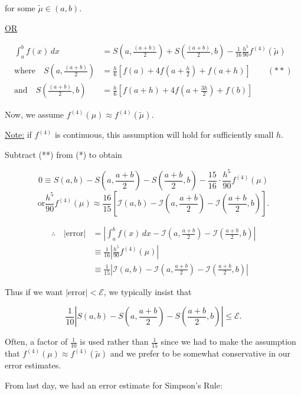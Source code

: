\documentclass[12pt]{article}
\newcommand{\bigEps}{\mathcal{E}}
\begin{document}
for some $\tilde{\mu} \in (a,b)$.

\uline{OR}

\begin{align*}
  \int_{a}^{b} f(x) \, dx &= S(a, \frac{(a+b)}{2}) + S(\frac{(a+b)}{2}, b) -
  \frac{1}{16} \frac{h^5}{90} f^{(4)} (\tilde\mu) \\
  \text{where} \quad  S(a, \frac{(a+b)}{2}) &= \frac{h}{6} \left[
    f(a) + 4f(a+\frac{h}{2}) + f(a+h)
  \right] \qquad (**)\\
    \text{and} \quad  S(\frac{(a+b)}{2},b) &= \frac{h}{6} \left[
      f(a+h) + 4f(a+\frac{3h}{2}) + f(b)
      \right]
\end{align*}

Now, we assume $f^{(4)}(\mu) \approx f^{(4)}(\tilde\mu)$.

\noindent
\uline{Note:} if $f^{(4)}$ is continuous, this assumption will hold for
sufficiently small $h$.

Subtract (**) from (*) to obtain

\[
0 \equiv S(a,b) - S\left(a, \frac{a+b}{2}\right) - S\left(\frac{a+b}{2}, b\right) - \frac{15}{16} \cdot \frac{h^5}{90} f^{(4)}(\mu)
\]
\[
\text{or} \frac{h^5}{90} f^{(4)}(\mu) \approx \frac{16}{15} \left[ \mathcal{I}(a,b) - \mathcal{I}\left(a, \frac{a+b}{2}\right) - \mathcal{I}\left(\frac{a+b}{2}, b\right) \right]
.\]

\begin{align*}
\therefore \quad \left| \text{error} \right| 
&= \left| \int_a^b f(x) \, dx - \mathcal{I}\left(a, \frac{a+b}{2}\right) - \mathcal{I}\left(\frac{a+b}{2}, b\right) \right| \\
&\equiv \frac{1}{16} \left| \frac{h^5}{90} f^{(4)}(\mu) \right| \\
&\equiv \frac{1}{15} \left| \mathcal{I}(a,b) - \mathcal{I}\left(a, \frac{a+b}{2}\right) - \mathcal{I}\left(\frac{a+b}{2}, b\right) \right|
\end{align*}

Thus if we want $|\text{error}|<\bigEps $, we typically insist that 

\[
\frac{1}{10} |S(a,b)-S(a,\frac{a+b}{2}) - S(\frac{a+b}{2}, b)| \leq \bigEps
.\]

Often, a factor of $\frac{1}{10}$ is used rather than $\frac{1}{15}$ since we
had to make the assumption that $f^{(4)}(\mu) \approx f^{(4)}(\tilde\mu)$ and we
prefer to be somewhat conservative in our error estimates.

From last day, we had an error estimate for Simpson's Rule: 
\end{document}
